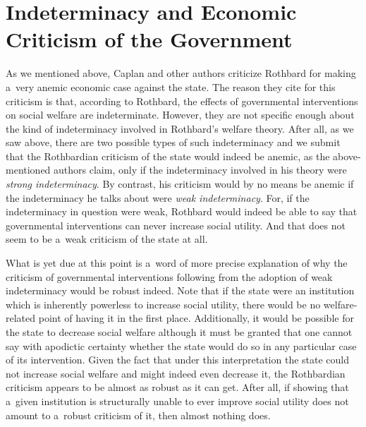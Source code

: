 \section{Indeterminacy and Economic Criticism of the Government}

As we mentioned above, Caplan and other authors criticize Rothbard for making a~very anemic economic case against the state. The reason they cite for this criticism is that, according to Rothbard, the effects of governmental interventions on social welfare are indeterminate. However, they are not specific enough about the kind of indeterminacy involved in Rothbard's welfare theory. After all, as we saw above, there are two possible types of such indeterminacy and we submit that the Rothbardian criticism of the state would indeed be anemic, as the above-mentioned authors claim, only if the indeterminacy involved in his theory were \textit{strong indeterminacy}. By contrast, his criticism would by no means be anemic if the indeterminacy he talks about were \textit{weak indeterminacy}. For, if the indeterminacy in question were weak, Rothbard would indeed be able to say that governmental interventions can never increase social utility. And that does not seem to be a~weak criticism of the state at all.



What is yet due at this point is a~word of more precise explanation of why the criticism of governmental interventions following from the adoption of weak indeterminacy would be robust indeed. Note that if the state were an institution which is inherently powerless to increase social utility, there would be no welfare-related point of having it in the first place. Additionally, it would be possible for the state to decrease social welfare although it must be granted that one cannot say with apodictic certainty whether the state would do so in any particular case of its intervention. Given the fact that under this interpretation the state could not increase social welfare and might indeed even decrease it, the Rothbardian criticism appears to be almost as robust as it can get. After all, if showing that a~given institution is structurally unable to ever improve social utility does not amount to a~robust criticism of it, then almost nothing does.



